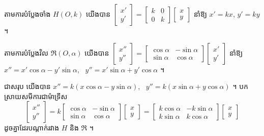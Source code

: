 តាមការបំប្លែងចាំង $H(O, k)$ យើងបាន $\begin{bmatrix} x'\\ y' \end{bmatrix} = \begin{bmatrix} k & 0\\ 0 & k \end{bmatrix}\begin{bmatrix} x\\ y \end{bmatrix}$ នាំឱ្យ $x' = kx$, $y' = ky$ ។

តាមការបំប្លែងវិល $\mathfrak{R}(O, \alpha)$ យើងបាន $\begin{bmatrix} x''\\ y'' \end{bmatrix} = \begin{bmatrix} \cos\alpha & -\sin\alpha\\ \sin\alpha & \cos\alpha \end{bmatrix}\begin{bmatrix} x'\\ y' \end{bmatrix}$ នាំឱ្យ $x'' = x'\cos\alpha - y'\sin\alpha$, \ $y'' = x'\sin\alpha + y'\cos\alpha$ ។

ជាសរុប យើងបាន $x'' = k(x\cos\alpha - y\sin\alpha)$, \ $y'' = k(x\sin\alpha + y\cos\alpha)$ ។ បកស្រាយសមីការជាម៉ាទ្រីស
\[ \begin{bmatrix} x''\\ y'' \end{bmatrix} = k\begin{bmatrix} \cos\alpha & -\sin\alpha\\ \sin\alpha & \cos\alpha \end{bmatrix}\begin{bmatrix} x\\ y \end{bmatrix} = \begin{bmatrix} k\cos\alpha & -k\sin\alpha\\ k\sin\alpha & k\cos\alpha \end{bmatrix}\begin{bmatrix} x\\ y \end{bmatrix} \]
ដូចគ្នាដែរបណ្ដាក់រវាង $H$ និង $\mathfrak{R}$ ។

